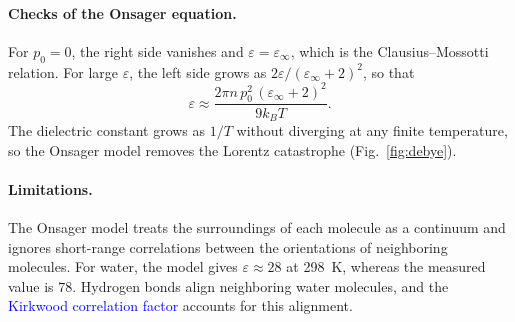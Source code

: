 \paragraph{Checks of the Onsager equation.}
For $p_0 = 0$, the right side vanishes and $\varepsilon = \varepsilon_\infty$, which is the Clausius--Mossotti relation. For large $\varepsilon$, the left side grows as $2\varepsilon/(\varepsilon_\infty + 2)^2$, so that
\begin{equation*}
    \varepsilon \approx \frac{2\pi n\,p_0^2\,(\varepsilon_\infty + 2)^2}{9k_BT}.
\end{equation*}
The dielectric constant grows as $1/T$ without diverging at any finite temperature, so the Onsager model removes the Lorentz catastrophe (Fig.~\ref{fig:debye}).

\paragraph{Limitations.}
The Onsager model treats the surroundings of each molecule as a continuum and ignores short-range correlations between the orientations of neighboring molecules. For water, the model gives $\varepsilon \approx 28$ at 298~K, whereas the measured value is $78$. Hydrogen bonds align neighboring water molecules, and the \textcolor{blue}{Kirkwood correlation factor} accounts for this alignment.

